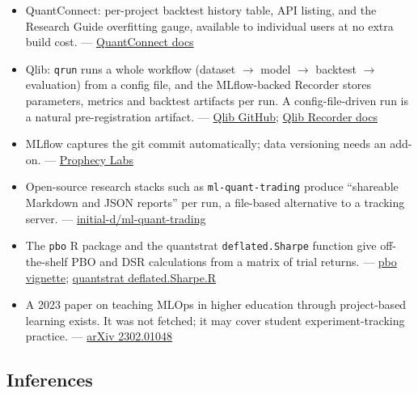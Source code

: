 \documentclass{article}
\begin{document}
\begin{itemize}

\item QuantConnect: per-project backtest history table, API listing, and the Research Guide overfitting gauge, available to individual users at no extra build cost. --- \href{https://www.quantconnect.com/docs/v2/cloud-platform/backtesting/research-guide}{QuantConnect docs}

\item Qlib: \texttt{qrun} runs a whole workflow (dataset \ensuremath{\rightarrow} model \ensuremath{\rightarrow} backtest \ensuremath{\rightarrow} evaluation) from a config file, and the MLflow-backed Recorder stores parameters, metrics and backtest artifacts per run. A config-file-driven run is a natural pre-registration artifact. --- \href{https://github.com/microsoft/qlib}{Qlib GitHub}; \href{https://qlib.readthedocs.io/en/latest/component/recorder.html}{Qlib Recorder docs}

\item MLflow captures the git commit automatically; data versioning needs an add-on. --- \href{https://www.prophecylabs.com/blog/a-swift-guide-to-experiment-tracking-with-mlflow}{Prophecy Labs}

\item Open-source research stacks such as \texttt{ml-\allowbreak{}quant-\allowbreak{}trading} produce ``shareable Markdown and JSON reports'' per run, a file-based alternative to a tracking server. --- \href{https://github.com/initial-d/ml-quant-trading}{initial-d/\allowbreak{}ml-quant-trading}

\item The \texttt{pbo} R package and the quantstrat \texttt{deflated.\allowbreak{}Sharpe} function give off-the-shelf PBO and DSR calculations from a matrix of trial returns. --- \href{https://cran.r-project.org/web/packages/pbo/vignettes/pbo.html}{pbo vignette}; \href{https://github.com/braverock/quantstrat/blob/master/R/deflated.Sharpe.R}{quantstrat deflated.Sharpe.R}

\item A 2023 paper on teaching MLOps in higher education through project-based learning exists. It was not fetched; it may cover student experiment-tracking practice. --- \href{https://arxiv.org/pdf/2302.01048}{arXiv 2302.01048}

\end{itemize}

\subsection{Inferences}
\end{document}
